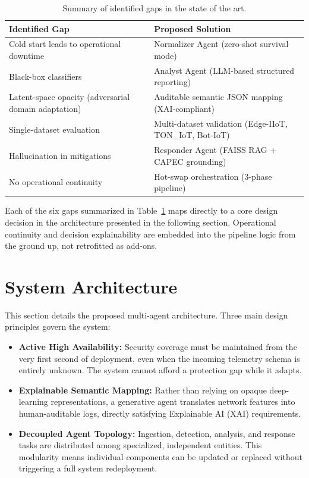 \documentclass[conference]{IEEEtran}
\begin{document}
\begin{table}[htbp]
    \caption{Summary of identified gaps in the state of the art.}
    \label{tab:sota_gaps}
    \centering
    \begin{tabular}{|p{5.5cm}|p{9.5cm}|}
        \hline
        \textbf{Identified Gap}                              & \textbf{Proposed Solution}                              \\
        \hline
        Cold start leads to operational downtime             & Normalizer Agent (zero-shot survival mode)              \\
        \hline
        Black-box classifiers                                & Analyst Agent (LLM-based structured reporting)          \\
        \hline
        Latent-space opacity (adversarial domain adaptation) & Auditable semantic JSON mapping (XAI-compliant)         \\
        \hline
        Single-dataset evaluation                            & Multi-dataset validation (Edge-IIoT, TON\_IoT, Bot-IoT) \\
        \hline
        Hallucination in mitigations                         & Responder Agent (FAISS RAG + CAPEC grounding)           \\
        \hline
        No operational continuity                            & Hot-swap orchestration (3-phase pipeline)               \\
        \hline
    \end{tabular}
\end{table}
Each of the six gaps summarized in Table~\ref{tab:sota_gaps} maps directly to a core design decision in the architecture presented in the following section. Operational continuity and decision explainability are embedded into the pipeline logic from the ground up, not retrofitted as add-ons.

\section{System Architecture}
\label{sec:arquitectura}

This section details the proposed multi-agent architecture. Three main design principles govern the system:
\begin{itemize}
    \item \textbf{Active High Availability:} Security coverage must be maintained from the very first second of deployment, even when the incoming telemetry schema is entirely unknown. The system cannot afford a protection gap while it adapts.
    \item \textbf{Explainable Semantic Mapping:} Rather than relying on opaque deep-learning representations, a generative agent translates network features into human-auditable logs, directly satisfying Explainable AI (XAI) requirements.
    \item \textbf{Decoupled Agent Topology:} Ingestion, detection, analysis, and response tasks are distributed among specialized, independent entities. This modularity means individual components can be updated or replaced without triggering a full system redeployment.
\end{itemize}
\end{document}
